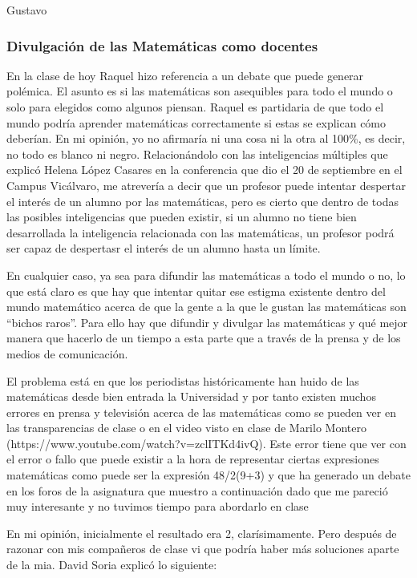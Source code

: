 \begin{opin}{\guscolor}{Gustavo}

\subsubsection{Divulgación de las Matemáticas como docentes}

En la clase de hoy Raquel hizo referencia a un debate que puede generar polémica. El asunto es si las matemáticas son asequibles para todo el mundo o solo para elegidos como algunos piensan. Raquel es partidaria de que todo el mundo podría aprender matemáticas correctamente si estas se explican cómo deberían. En mi opinión, yo no afirmaría ni una cosa ni la otra al 100\%, es decir, no todo es blanco ni negro. Relacionándolo con las inteligencias múltiples que explicó Helena López Casares en la conferencia que dio el 20 de septiembre en el Campus Vicálvaro, me atrevería a decir que un profesor puede intentar despertar el interés de un alumno por las matemáticas, pero es cierto que dentro de todas las posibles inteligencias que pueden existir, si un alumno no tiene bien desarrollada la inteligencia relacionada con las matemáticas, un profesor podrá ser capaz de despertasr el interés de un alumno hasta un límite.

En cualquier caso, ya sea para difundir las matemáticas a todo el mundo o no, lo que está claro es que hay que intentar quitar ese estigma existente dentro del mundo matemático acerca de que la gente a la que le gustan las matemáticas son “bichos raros”. Para ello hay que difundir y divulgar las matemáticas y qué mejor manera que hacerlo de un tiempo a esta parte que a través de la prensa y de los medios de comunicación. 

El problema está en que los periodistas históricamente han huido de las matemáticas desde bien entrada la Universidad y por tanto existen muchos errores en prensa y televisión acerca de las matemáticas como se pueden ver en las transparencias de clase o en el video visto en clase de Marilo Montero (https://www.youtube.com/watch?v=zclITKd4ivQ). Este error tiene que ver con el error o fallo que puede existir a la hora de representar ciertas expresiones matemáticas como puede ser la expresión 48/2(9+3) y que ha generado un debate en los foros de la asignatura que muestro a continuación dado que  me pareció muy interesante y no tuvimos tiempo para abordarlo en clase

En mi opinión, inicialmente el resultado era 2, clarísimamente. Pero después de razonar con mis compañeros de clase vi que podría haber más soluciones aparte de la mia. David Soria explicó lo siguiente: 


\end{opin}

